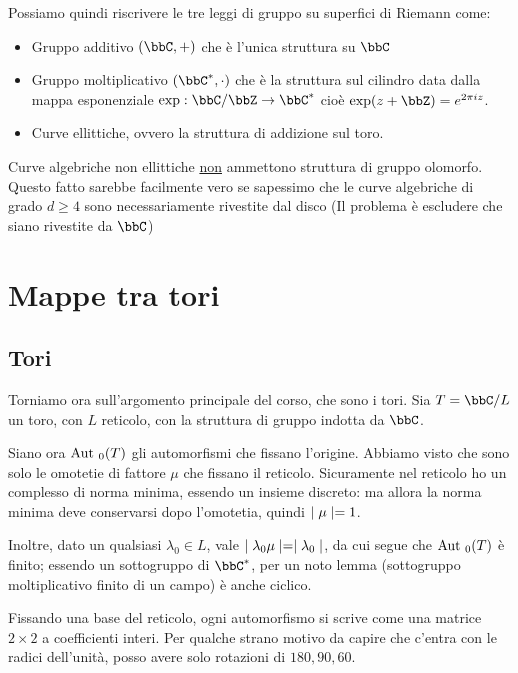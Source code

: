 Possiamo quindi riscrivere le tre leggi di gruppo su superfici di Riemann come:
\begin{itemize}
    \item Gruppo additivo $(\bbC,+)$ che è l'unica struttura su $\bbC$
    \item Gruppo moltiplicativo $(\bbC^\ast,\cdot)$ che è la struttura sul cilindro data dalla mappa esponenziale $\exp: \bbC / \bbZ \to \bbC^\ast$ cioè $\exp(z+\bbZ)=e^{2\pi i z}$.
    \item Curve ellittiche, ovvero la struttura di addizione sul toro.
\end{itemize}

\begin{corollario}
  Curve algebriche non ellittiche \underline{non} ammettono struttura di gruppo olomorfo.
  Questo fatto sarebbe facilmente vero se sapessimo che le curve algebriche di grado $d \ge 4$ sono necessariamente rivestite dal disco (Il problema è escludere che siano rivestite da $\bbC$)
\end{corollario}




\chapter{Mappe tra tori}


	\section{Tori}

	Torniamo ora sull'argomento principale del corso, che sono i tori. Sia $T = \bbC / L$ un toro, con $L$ reticolo, con la struttura di gruppo indotta da $\bbC$.

	Siano ora $\text{Aut }_0(T)$ gli automorfismi che fissano l'origine. Abbiamo visto che sono solo le omotetie di fattore $\mu$ che fissano il reticolo. Sicuramente nel reticolo ho un complesso di norma minima, essendo un insieme discreto: ma allora la norma minima deve conservarsi dopo l'omotetia, quindi $\mid \mu \mid=1$.

	Inoltre, dato un qualsiasi $\lambda_0 \in L$, vale $\mid \lambda_0 \mu \mid = \mid \lambda_0 \mid$, da cui segue che $\text{Aut }_0(T)$ è finito; essendo un sottogruppo di $\bbC^*$, per un noto lemma (sottogruppo moltiplicativo finito di un campo) è anche ciclico.

	Fissando una base del reticolo, ogni automorfismo si scrive come una matrice $2 \times 2$ a coefficienti interi. Per qualche strano motivo da capire che c'entra con le radici dell'unità, %
	posso avere solo rotazioni di $180, 90, 60$.


